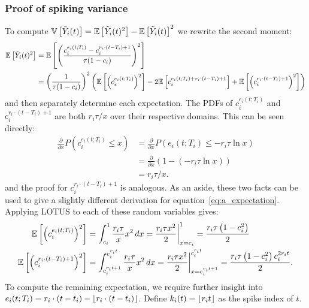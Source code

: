 \subsubsection{Proof of spiking variance}

To compute $\mathbb{V}\left[{\tilde{Y}_i(t)}\right] = \mathbb{E}\left[{\tilde{Y}_i(t)^2}\right] - \mathbb{E}\left[{\tilde{Y}_i(t)}\right]^2$ we rewrite the second moment:
\begin{align*}
\mathbb{E}\left[{\tilde{Y}_i(t)^2}\right] &= \mathbb{E}\left[{\left( \frac{c_i^{e_i(t; T_i)} - c_i^{r_i \cdot (t - T_i) + 1}}{\tau(1 - c_i)} \right)^2}\right] \\
&= \left( \frac{1}{\tau(1 - c_i)} \right)^2 \left( \mathbb{E}\left[{\left(c_i^{e_i(t; T_i)}\right)^2 }\right] - 2 \mathbb{E}\left[{c_i^{e_i(t; T_i) + r_i \cdot (t - T_i) + 1}}\right] + \mathbb{E}\left[{\left( c_i^{r_i \cdot (t - T_i) + 1} \right)^2}\right] \right)
\end{align*}
and then separately determine each expectation.
The PDFs of $c_i^{e_i(t; T_i)}$ and $c_i^{r_i \cdot (t - T_i) + 1}$ are both $r_i \tau / x$ over their respective domains. This can be seen directly:
\begin{align*}
\frac{\partial}{\partial x} P \left( c_i^{e_i(t; T_i)} \le x \right) &= \frac{\partial}{\partial x} P \left( e_i(t; T_i) \le -r_i \tau \ln x \right) \\
&= \frac{\partial}{\partial x} \left( 1 - (-r_i \tau \ln x) \right) \\
&= r_i \tau / x .
\end{align*}
and the proof for $c_i^{r_i \cdot (t - T_i) + 1}$ is analogous.
As an aside, these two facts can be used to give a slightly different derivation for equation~\ref{eq:a_expectation}.
Applying LOTUS to each of these random variables gives:
\begin{align*}
\mathbb{E}\left[{\left(c_i^{e_i(t; T_i)}\right)^2}\right] &= \int_{c_i}^1 \frac{r_i \tau}{x} x^2 \,dx = \frac{r_i \tau x^2}{2} \bigg|_{x = c_i}^1 = \frac{r_i \tau \left(1 - c_i^2 \right)}{2} \\
\mathbb{E}\left[{\left(c_i^{r_i \cdot (t - T_i) + 1}\right)^2}\right] &= \int_{c_i^{r_i t + 1}}^{c_i^{r_i t}} \frac{r_i \tau}{x} x^2 \,dx = \frac{r_i \tau x^2}{2} \bigg|_{x = c_i^{r_i t + 1}}^{c_i^{r_i t}} = \frac{r_i \tau \left(1 - c_i^2 \right) c_i^{2 r_i t}}{2} .
\end{align*}
To compute the remaining expectation, we require further insight into $e_i(t; T_i) = r_i \cdot (t - t_i) - \lfloor {r_i \cdot (t - t_i)} \rfloor$.
Define $k_i(t) = \lfloor {r_i t} \rfloor$ as the spike index of $t$.  %

